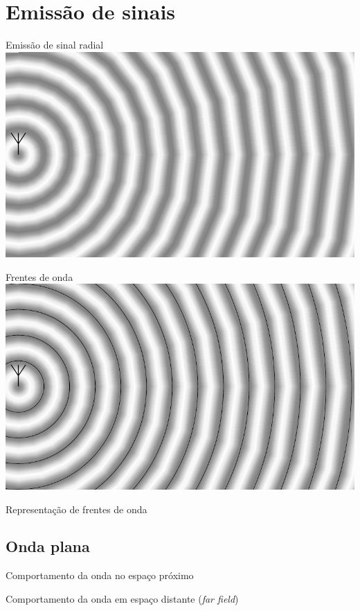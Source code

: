 
\section{Emissão de sinais}

    \begin{frame}{Emissão de sinal radial}
        \includegraphics{../pictures/signal.pdf}
    \end{frame}

    \begin{frame}{Frentes de onda}
        \includegraphics{../pictures/signal+lines.pdf}
    \end{frame}

    \begin{frame}{Representação de frentes de onda}
        
    \end{frame}

\subsection{Onda plana}

    \begin{frame}{Comportamento da onda no espaço próximo}
        
    \end{frame}

    \begin{frame}{Comportamento da onda em espaço distante (\textit{far field})}
        
    \end{frame}